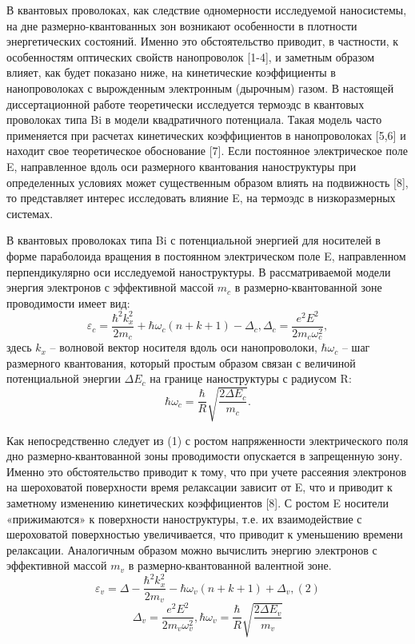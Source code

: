 В квантовых проволоках, как следствие одномерности исследуемой наносистемы, на дне размерно-квантованных зон возникают особенности в плотности энергетических состояний. Именно это обстоятельство приводит, в частности, к особенностям оптических свойств нанопроволок [1-4], и заметным образом влияет, как будет показано ниже, на кинетические коэффициенты в нанопроволоках с вырожденным электронным (дырочным) газом. В настоящей диссертационной работе теоретически исследуется термоэдс в квантовых проволоках типа Bi в модели квадратичного потенциала. Такая модель часто применяется при расчетах кинетических коэффициентов в нанопроволоках [5,6] и находит свое теоретическое обоснование [7]. Если постоянное электрическое поле E, направленное вдоль оси размерного квантования наноструктуры при определенных условиях может существенным образом влиять на подвижность [8], то представляет интерес исследовать влияние E, на термоэдс в низкоразмерных системах.
 
В квантовых проволоках типа Bi с потенциальной энергией для носителей в форме параболоида вращения в постоянном электрическом поле E, направленном перпендикулярно оси исследуемой наноструктуры. В рассматриваемой модели энергия электронов с эффективной массой $m_{c} $ в размерно-квантованной зоне проводимости имеет вид:
\begin{equation} \label{eq:44_10}
\varepsilon _{c} =\frac{\hbar ^{2} k_{x}^{2} }{2m_{c} } +\hbar \omega _{c} \left(n+k+1\right)-\Delta _{c} , \Delta _{c} =\frac{e^{2} E^{2} }{2m_{c} \omega _{c}^{2} } , 
\end{equation} 
здесь $k_{x} $ -- волновой вектор носителя вдоль оси нанопроволоки, $\hbar \omega _{c} $ -- шаг размерного квантования, который простым образом связан с величиной потенциальной энергии $\Delta E_{c} $ на границе наноструктуры с радиусом R:
\[
\hbar \omega _{c} =\frac{\hbar }{R} \sqrt{\frac{2\Delta E_{c} }{m_{c} } } .
\] 

Как непосредственно следует из (1) с ростом напряженности электрического поля дно размерно-квантованной зоны проводимости опускается в запрещенную зону. Именно это обстоятельство приводит к тому, что при учете рассеяния электронов на шероховатой поверхности время релаксации зависит от E, что и приводит к заметному изменению кинетических коэффициентов [8]. С ростом E носители «прижимаются» к поверхности наноструктуры, т.е. их взаимодействие с шероховатой поверхностью увеличивается, что приводит к уменьшению времени релаксации. Аналогичным образом можно вычислить энергию электронов с эффективной массой $m_{v} $ в размерно-квантованной валентной зоне.
\begin{equation} \label{eq:44_20}
\varepsilon _{v} =\Delta -\frac{\hbar ^{2} k_{x}^{2} }{2m_{v} } -\hbar \omega _{v} \left(n+k+1\right)+\Delta _{v} , (2)
\end{equation} 
\[
\Delta _{v} =\frac{e^{2} E^{2} }{2m_{v} \omega _{v}^{2} } , \hbar \omega _{v} =\frac{\hbar }{R} \sqrt{\frac{2\Delta E_{v} }{m_{v} } } 
\] 


